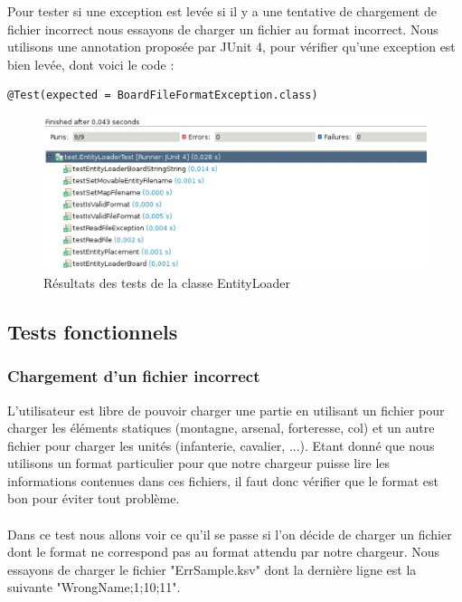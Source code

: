 				Pour tester si une exception est levée si il y a une tentative de chargement de fichier incorrect nous essayons de charger un fichier au format incorrect.
				Nous utilisons une annotation proposée par JUnit 4, pour vérifier qu'une exception est bien levée, dont voici le code : 
				
				\begin{lstlisting}[frame=single]
@Test(expected = BoardFileFormatException.class)
				\end{lstlisting}

				\begin{figure}[!h]
				    \caption{Résultats des tests de la classe EntityLoader}
				    \centering
				    \includegraphics[width=\textwidth]{images/tests_unitaires/entityloader.ps}
				\end{figure}

				
				
		
		\subsection{Tests fonctionnels}
		
			\subsubsection{Chargement d'un fichier incorrect}
				L'utilisateur est libre de pouvoir charger une partie en utilisant un fichier pour charger les éléments statiques (montagne, arsenal, forteresse, col) et un autre fichier pour charger les unités (infanterie, cavalier, ...). Etant donné que nous utilisons un format particulier pour que notre chargeur puisse lire les informations contenues dans ces fichiers, il faut donc vérifier que le format est bon pour éviter tout problème.
				\\ \\
				Dans ce test nous allons voir ce qu'il se passe si l'on décide de charger un fichier dont le format ne correspond pas au format attendu par notre chargeur.
				Nous essayons de charger le fichier "ErrSample.ksv" dont la dernière ligne est la suivante "WrongName;1;10;11". 

